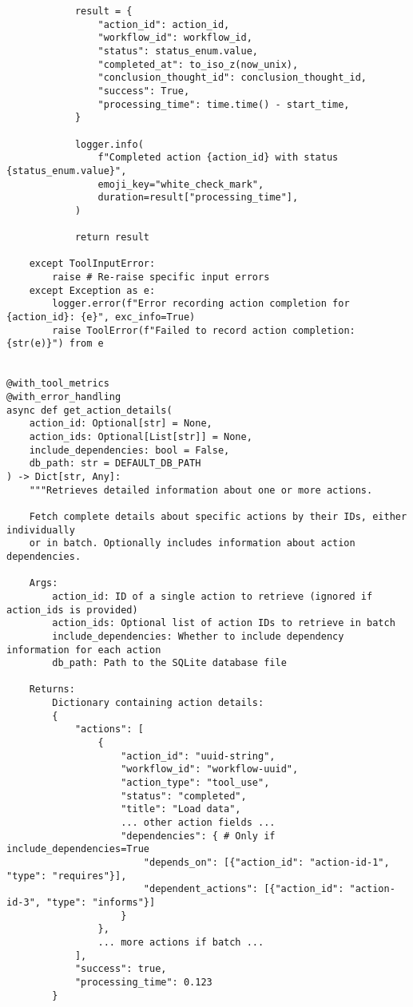 \documentclass[12pt,a4paper]{article}
\begin{document}
\begin{pageablecode}
\begin{verbatim}
            result = {
                "action_id": action_id,
                "workflow_id": workflow_id,
                "status": status_enum.value,
                "completed_at": to_iso_z(now_unix),
                "conclusion_thought_id": conclusion_thought_id,
                "success": True,
                "processing_time": time.time() - start_time,
            }

            logger.info(
                f"Completed action {action_id} with status {status_enum.value}",
                emoji_key="white_check_mark",
                duration=result["processing_time"],
            )

            return result

    except ToolInputError:
        raise # Re-raise specific input errors
    except Exception as e:
        logger.error(f"Error recording action completion for {action_id}: {e}", exc_info=True)
        raise ToolError(f"Failed to record action completion: {str(e)}") from e
    

@with_tool_metrics
@with_error_handling
async def get_action_details(
    action_id: Optional[str] = None,
    action_ids: Optional[List[str]] = None,
    include_dependencies: bool = False,
    db_path: str = DEFAULT_DB_PATH
) -> Dict[str, Any]:
    """Retrieves detailed information about one or more actions.

    Fetch complete details about specific actions by their IDs, either individually
    or in batch. Optionally includes information about action dependencies.

    Args:
        action_id: ID of a single action to retrieve (ignored if action_ids is provided)
        action_ids: Optional list of action IDs to retrieve in batch
        include_dependencies: Whether to include dependency information for each action
        db_path: Path to the SQLite database file

    Returns:
        Dictionary containing action details:
        {
            "actions": [
                {
                    "action_id": "uuid-string",
                    "workflow_id": "workflow-uuid",
                    "action_type": "tool_use",
                    "status": "completed",
                    "title": "Load data",
                    ... other action fields ...
                    "dependencies": { # Only if include_dependencies=True
                        "depends_on": [{"action_id": "action-id-1", "type": "requires"}],
                        "dependent_actions": [{"action_id": "action-id-3", "type": "informs"}]
                    }
                },
                ... more actions if batch ...
            ],
            "success": true,
            "processing_time": 0.123
        }


\end{verbatim}
\end{pageablecode}
\end{document}
